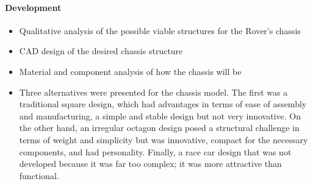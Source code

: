 \documentclass{article}
\begin{document}
\paragraph{Development}
\begin{itemize}
    \item Qualitative analysis of the possible viable structures for the Rover's chassis
    \item CAD design of the desired chassis structure
    \item Material and component analysis of how the chassis will be
    \item Three alternatives were presented for the chassis model. The first was a traditional square design, which had advantages in terms of ease of assembly and manufacturing, a simple and stable design but not very innovative. On the other hand, an irregular octagon design posed a structural challenge in terms of weight and simplicity but was innovative, compact for the necessary components, and had personality. Finally, a race car design that was not developed because it was far too complex; it was more attractive than functional. 
    
\end{itemize}
\end{document}
